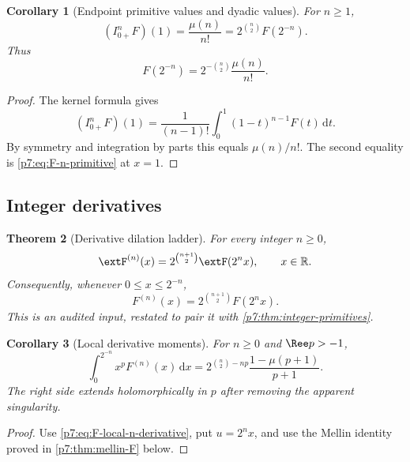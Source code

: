 \documentclass[11pt,oneside]{article}
\newtheorem{theorem}{Theorem}[section]
\newtheorem{corollary}[theorem]{Corollary}
\theoremstyle{definition}
\theoremstyle{remark}
\newcommand{\R}{\mathbb R}
\newcommand{\dd}{\,\mathrm d}
\newcommand{\1}{\mathbf 1}
\begin{document}
\begin{corollary}[Endpoint primitive values and dyadic values]
\label{p7:cor:primitive-endpoints}
For $n\ge1$,
\begin{equation}
 (I_{0+}^{n}F)(1)=\frac{\mu(n)}{n!}
 =2^{\binom n2}F(2^{-n}).
 \label{p7:eq:primitive-endpoint-moment}
\end{equation}
Thus
\begin{equation}
 F(2^{-n})=2^{-\binom n2}\frac{\mu(n)}{n!}.
 \label{p7:eq:dyadic-moment-basic}
\end{equation}
\end{corollary}

\begin{proof}
The kernel formula gives
\[
 (I_{0+}^{n}F)(1)=\frac1{(n-1)!}\int_0^1(1-t)^{n-1}F(t)\dd t.
\]
By symmetry and integration by parts this equals $\mu(n)/n!$.  The second equality is
\cref{p7:eq:F-n-primitive} at $x=1$.
\end{proof}

\subsection{Integer derivatives}

\begin{theorem}[Derivative dilation ladder]
\label{p7:thm:integer-derivatives}
For every integer $n\ge0$,
\begin{equation}
 \extF^{(n)}(x)=2^{\binom{n+1}{2}}\extF(2^nx),
 \qquad x\in\R.
 \label{p7:eq:global-n-derivative}
\end{equation}
Consequently, whenever $0\le x\le2^{-n}$,
\begin{equation}
 F^{(n)}(x)=2^{\binom{n+1}{2}}F(2^nx).
 \label{p7:eq:F-local-n-derivative}
\end{equation}
This is an audited input, restated to pair it with \cref{p7:thm:integer-primitives}.
\end{theorem}

\begin{corollary}[Local derivative moments]
\label{p7:cor:local-derivative-moments}
For $n\ge0$ and $\Ree p>-1$,
\begin{equation}
 \int_0^{2^{-n}}x^pF^{(n)}(x)\dd x
 =2^{\binom n2-np}\frac{1-\mu(p+1)}{p+1}.
 \label{p7:eq:local-derivative-moment}
\end{equation}
The right side extends holomorphically in $p$ after removing the apparent singularity.
\end{corollary}

\begin{proof}
Use \cref{p7:eq:F-local-n-derivative}, put $u=2^nx$, and use the Mellin identity proved in
\cref{p7:thm:mellin-F} below.
\end{proof}
\end{document}
